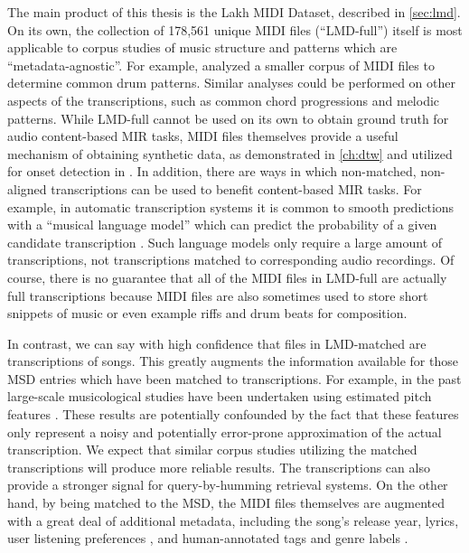The main product of this thesis is the Lakh MIDI Dataset, described in \cref{sec:lmd}.
On its own, the collection of 178,561 unique MIDI files (``LMD-full'') itself is most applicable to corpus studies of music structure and patterns which are ``metadata-agnostic''.
For example, \cite{mauch2012corpus} analyzed a smaller corpus of MIDI files to determine common drum patterns.
Similar analyses could be performed on other aspects of the transcriptions, such as common chord progressions and melodic patterns.
While LMD-full cannot be used on its own to obtain ground truth for audio content-based MIR tasks, MIDI files themselves provide a useful mechanism of obtaining synthetic data, as demonstrated in \cref{ch:dtw} and utilized for onset detection in \cite{bello2005tutorial}.
In addition, there are ways in which non-matched, non-aligned transcriptions can be used to benefit content-based MIR tasks.
For example, in automatic transcription systems it is common to smooth predictions with a ``musical language model'' which can predict the probability of a given candidate transcription \cite{poliner2007discriminative,sigtia2015end}.
Such language models only require a large amount of transcriptions, not transcriptions matched to corresponding audio recordings.
Of course, there is no guarantee that all of the MIDI files in LMD-full are actually full transcriptions because MIDI files are also sometimes used to store short snippets of music or even example riffs and drum beats for composition.

In contrast, we can say with high confidence that files in LMD-matched are transcriptions of songs.
This greatly augments the information available for those MSD entries which have been matched to transcriptions.
For example, in the past large-scale musicological studies have been undertaken using estimated pitch features \cite{serra2012measuring,bertin2010clustering}.
These results are potentially confounded by the fact that these features only represent a noisy and potentially error-prone approximation of the actual transcription.
We expect that similar corpus studies utilizing the matched transcriptions will produce more reliable results.
The transcriptions can also provide a stronger signal for query-by-humming retrieval systems.
On the other hand, by being matched to the MSD, the MIDI files themselves are augmented with a great deal of additional metadata, including the song's release year, lyrics, user listening preferences \cite{jansson2015this}, and human-annotated tags and genre labels \cite{schreiber2015improving}.

